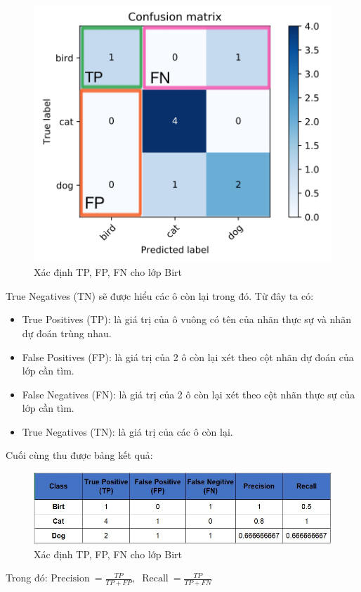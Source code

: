 \begin{center}
    \begin{figure}[!h]
        \centering
        \includegraphics[scale = 0.5]{fileanh/7.png}
        \caption{Xác định TP, FP, FN cho lớp Birt}
    \end{figure}
\end{center}
True Negatives (TN) sẽ được hiểu các ô còn lại trong đó. Từ đây ta có:
\begin{itemize}
    \item True Positives (TP): là giá trị của ô vuông có tên của nhãn thực sự và nhãn dự đoán trùng nhau.
    \item False Positives (FP): là giá trị của 2 ô còn lại xét theo cột nhãn dự đoán của lớp cần tìm.
    \item False Negatives (FN): là giá trị của 2 ô còn lại xét theo cột nhãn thực sự của lớp cần tìm.
    \item True Negatives (TN): là giá trị của các ô còn lại.
\end{itemize}
Cuối cùng thu được bảng kết quả:
\begin{center}
    \begin{figure}[!h]
        \centering
        \includegraphics[scale = 1]{fileanh/8.jpg}
        \caption{Xác định TP, FP, FN cho lớp Birt}
    \end{figure}
\end{center}
Trong đó:
$\displaystyle \text{Precision}\ = \frac{TP}{TP + FP},\ \text{ Recall}\ = \frac{TP}{TP + FN}$\\

